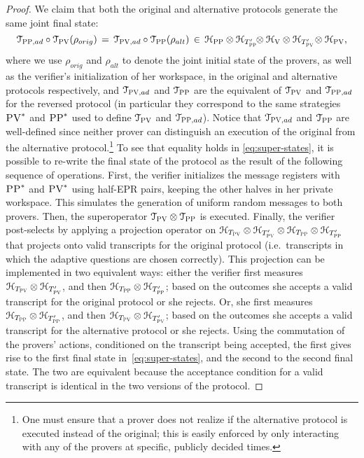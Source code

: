 \begin{proof}
We claim that both the original and alternative protocols generate the same joint final state:
\begin{equation}\label{eq:super-states}
\mathcal{T}_{\textsc{PP},ad}\circ\mathcal{T}_{\textsc{PV}}(\rho_{orig}) \,=\, \mathcal{T}_{\textsc{PV},ad}\circ \mathcal{T}_{\textsc{PP}}(\rho_{alt}) \,\in\,  \mathcal{H}_{\textsc{PP}}\otimes \mathcal{H}_{T'_{\textsc{PP}}}\!\! \otimes \mathcal{H}_{\textsc{V}} \otimes \mathcal{H}_{T'_{\textsc{PV}}}\! \otimes \mathcal{H}_{\textsc{PV}},
\end{equation}
where we use $\rho_{orig}$ and $\rho_{alt}$ to denote the joint initial state
  of the provers, as well as the verifier's initialization of her workspace, in
  the original and alternative protocols respectively, and $\mathcal{T}_{\textsc{PV},ad}$ and $\mathcal{T}_{\textsc{PP}}$ are the equivalent of $\mathcal{T}_{\textsc{PV}}$ and $\mathcal{T}_{\textsc{PP},ad}$ for the reversed protocol (in particular they correspond to the same strategies $\textsc{PV}^*$ and $\textsc{PP}^*$ used to define $\mathcal{T}_{\textsc{PV}}$ and  $\mathcal{T}_{\textsc{PP},ad}$). Notice that $\mathcal{T}_{\textsc{PV},ad}$ and $\mathcal{T}_{\textsc{PP}}$ are well-defined since neither prover can distinguish %
an execution of the original 
from 
the alternative protocol.\footnote{One must ensure that a prover does not realize if the  alternative protocol is executed instead of the original; this is easily enforced by only interacting with any of the provers at specific, publicly decided times.}
To see that 
equality holds in \eqref{eq:super-states},
it is possible to re-write the final state of the protocol as the
  result of the following sequence of operations. First, the verifier
  initializes the message registers with $\textsc{PP}^*$ and $\textsc{PV}^*$ using half-EPR
  pairs, keeping the other halves in her private workspace. This simulates the
  generation of 
uniform
random messages to both provers. Then, the
  superoperator $\mathcal{T}_{\textsc{PV}} \otimes \mathcal{T}_{\textsc{PP}}$ is executed. Finally, the verifier
  post-selects by applying a projection operator on $\mathcal{H}_{T_{\textsc{PV}}} \otimes \mathcal{H}_{T'_{\textsc{PV}}} \otimes \mathcal{H}_{T_{\textsc{PP}}} \otimes \mathcal{H}_{T'_{\textsc{PP}}}$ 
that 
projects onto valid transcripts for the
  original protocol (i.e.\ transcripts in which the adaptive questions are chosen
  correctly). This projection can be implemented in two equivalent ways: either
  the verifier first measures $ \mathcal{H}_{T_{\textsc{PV}}} \otimes \mathcal{H}_{T'_{\textsc{PV}}}$, and then
  $\mathcal{H}_{T_{\textsc{PP}}} \otimes \mathcal{H}_{T'_{\textsc{PP}}}$; based on the outcomes she accepts a valid transcript for the
  original protocol or she rejects. Or, she first measures $ \mathcal{H}_{T_{\textsc{PP}}} \otimes \mathcal{H}_{T'_{\textsc{PP}}}$, and then
  $\mathcal{H}_{T_{\textsc{PV}}} \otimes \mathcal{H}_{T'_{\textsc{PV}}}$; based on the outcomes she accepts a
  valid transcript for the alternative protocol or she rejects. Using the
  commutation of the provers' actions, conditioned on the transcript being
  accepted, the first gives rise to the first final state
  in~\eqref{eq:super-states}, and the second to the second final state. The two are equivalent because the acceptance condition for a valid transcript is identical in the two versions of the protocol.



\end{proof}
